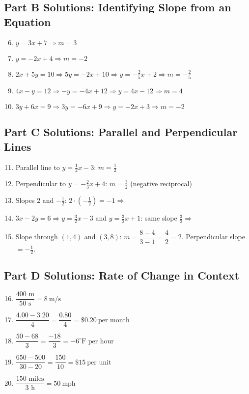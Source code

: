 \documentclass[14pt]{extarticle}
\begin{document}
\subsection*{Part B Solutions: Identifying Slope from an Equation}
\begin{enumerate}
    \setcounter{enumi}{5}
    \item \(y=3x+7\Rightarrow m=\boxed{3}\)
    \item \(y=-2x+4\Rightarrow m=\boxed{-2}\)
    \item \(2x+5y=10\Rightarrow 5y=-2x+10\Rightarrow y=-\tfrac{2}{5}x+2 \Rightarrow m=\boxed{-\tfrac{2}{5}}\)
    \item \(4x-y=12\Rightarrow -y=-4x+12\Rightarrow y=4x-12 \Rightarrow m=\boxed{4}\)
    \item \(3y+6x=9\Rightarrow 3y=-6x+9\Rightarrow y=-2x+3 \Rightarrow m=\boxed{-2}\)
\end{enumerate}

\subsection*{Part C Solutions: Parallel and Perpendicular Lines}
\begin{enumerate}
    \setcounter{enumi}{10}
    \item Parallel line to \(y=\tfrac{1}{2}x-3\): \(m=\boxed{\tfrac{1}{2}}\)
    \item Perpendicular to \(y=-\tfrac{2}{3}x+4\): \(m=\boxed{\tfrac{3}{2}}\) \quad (negative reciprocal)
    \item Slopes \(2\) and \(-\tfrac{1}{2}\): \(2\cdot(-\tfrac{1}{2})=-1\Rightarrow\) 
    \item \(3x-2y=6 \Rightarrow y=\tfrac{3}{2}x-3\) and \(y=\tfrac{3}{2}x+1\): same slope \(\tfrac{3}{2}\Rightarrow\) 
    \item Slope through \((1,4)\) and \((3,8)\): \(m=\dfrac{8-4}{3-1}=\dfrac{4}{2}=2\). Perpendicular slope \(=\boxed{-\tfrac{1}{2}}\).
\end{enumerate}

\subsection*{Part D Solutions: Rate of Change in Context}
\begin{enumerate}
    \setcounter{enumi}{15}
    \item \(\dfrac{400\text{ m}}{50\text{ s}}=\boxed{8\ \text{m/s}}\)
    \item \(\dfrac{4.00-3.20}{4}=\dfrac{0.80}{4}=\boxed{\$0.20\ \text{per month}}\)
    \item \(\dfrac{50-68}{3}=\dfrac{-18}{3}=\boxed{-6^\circ\text{F per hour}}\)
    \item \(\dfrac{650-500}{30-20}=\dfrac{150}{10}=\boxed{\$15\ \text{per unit}}\)
    \item \(\dfrac{150\text{ miles}}{3\text{ h}}=\boxed{50\ \text{mph}}\)
\end{enumerate}
\end{document}
